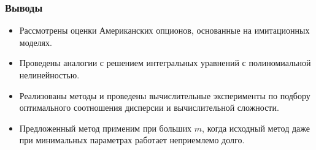 \documentclass[unicode, notheorems]{beamer}
\begin{document}
\begin{frame}
    \frametitle{Выводы}
    \begin{itemize}
        \item Рассмотрены оценки Американских опционов, основанные на имитационных моделях.
        \item Проведены аналогии с решением интегральных уравнений с полиномиальной нелинейностью.
        \item Реализованы методы и проведены вычислительные эксперименты по подбору оптимального соотношения дисперсии и вычислительной сложности.
        \item Предложенный метод применим при больших $m$, когда исходный метод даже при минимальных параметрах работает неприемлемо долго.
    \end{itemize}
\end{frame}



\end{document}

